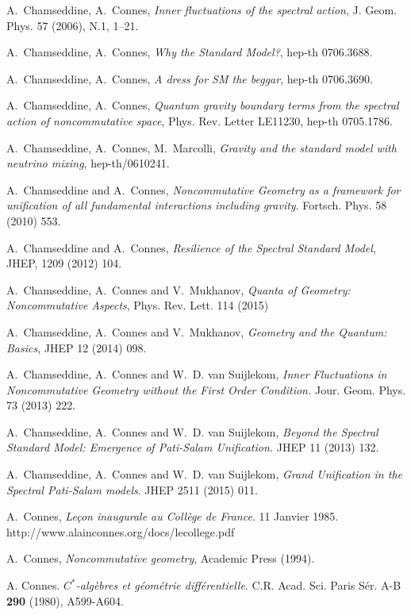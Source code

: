 \documentclass[12pt]{article}
\begin{document}
\begin{thebibliography}{99}
 A.~Chamseddine, A.~Connes,
{\em Inner fluctuations of the spectral action}, J. Geom. Phys.  57
(2006),  N.1, 1--21.

 A.~Chamseddine, A.~Connes, {\em Why the Standard
Model?}, hep-th 0706.3688.

 A.~Chamseddine, A.~Connes, {\em A dress for SM the
beggar}, hep-th 0706.3690.

 A.~Chamseddine, A.~Connes, {\em Quantum gravity
boundary terms from the spectral action of noncommutative space},
Phys. Rev. Letter LE11230, hep-th 0705.1786.

 A.~Chamseddine, A.~Connes, M.~Marcolli,
{\em Gravity and the standard model with neutrino mixing},
hep-th/0610241.

 A.~Chamseddine and A.~Connes,
\emph{Noncommutative Geometry as a framework for unification of all fundamental interactions including gravity}.
 Fortsch. Phys. 58 (2010) 553.

 A.~Chamseddine and A.~Connes,
 \emph{Resilience of the Spectral Standard Model}, JHEP,
1209 (2012) 104.


 A.~Chamseddine, A.~Connes and V.~Mukhanov,
\emph{Quanta of Geometry: Noncommutative Aspects}, Phys. Rev. Lett. 114 (2015) 

 A.~Chamseddine, A.~Connes and V.~Mukhanov,
\emph{Geometry and the Quantum: Basics}, JHEP 12 (2014) 098.

 A.~Chamseddine, A.~Connes and W.~D. van Suijlekom,
\emph{Inner Fluctuations in Noncommutative Geometry without the First Order Condition.} 
 Jour. Geom. Phys. 73 (2013) 222.

 A.~Chamseddine, A.~Connes and W.~D. van Suijlekom,
\emph{Beyond the Spectral Standard Model: Emergence of Pati-Salam Unification.} JHEP 11 (2013) 132.


 A.~Chamseddine, A.~Connes and W.~D. van Suijlekom,
\emph{Grand Unification in the Spectral Pati-Salam models}. JHEP 2511 (2015) 011.



 A.~Connes, {\em Le\c{c}on inaugurale au Coll\`ege de France}. 11 Janvier 1985. http://www.alainconnes.org/docs/lecollege.pdf

   A.~Connes, {\it Noncommutative geometry},
 Academic Press (1994).
 
  A. Connes. {\em  $C^*$-alg\`ebres et
g\'eom\'etrie diff\'erentielle}.  C.R. Acad. Sci.
Paris S\'er. A-B {\bf 290} (1980), A599-A604.


\end{thebibliography}
\end{document}
